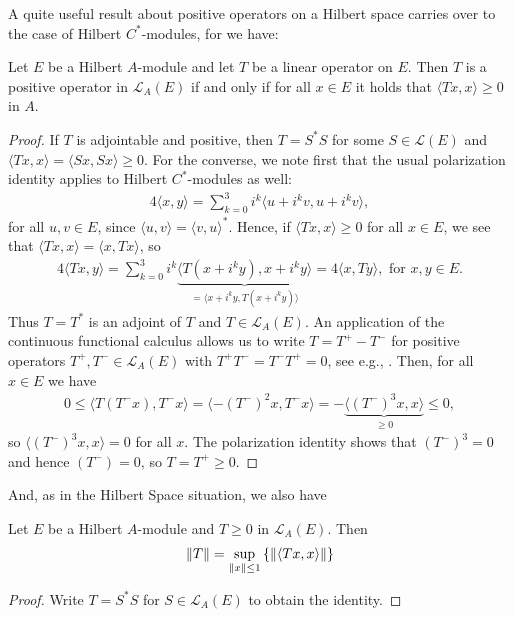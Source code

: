 A quite useful result about positive operators on a Hilbert space carries over to the case of Hilbert $C^*$-modules, for we have:
\begin{lemma}
	Let $E$ be a Hilbert $A$-module and let $T$ be a linear operator on $E$. Then $T$ is a positive operator in $\mathcal{L}_A(E)$ if and only if for all $x \in E$ it holds that $\langle Tx,x \rangle \geq 0$ in $A$.
	\label{mult:Tpos}
\end{lemma}
\begin{proof}
	If $T$ is adjointable and positive, then $T=S^*S$ for some $S \in \mathcal{L}(E)$ and $\langle Tx,x\rangle = \langle Sx,Sx\rangle\geq 0$. For the converse, we note first that the usual polarization identity applies to Hilbert $C^*$-modules as well:
	\begin{align*}
		4\langle x, y\rangle = \sum_{k=0}^3 i^{k} \langle u+i^kv,u+i^kv\rangle,
	\end{align*}
	for all $u,v \in E$, since $ \langle u,v \rangle = \langle v,u\rangle ^*$. Hence, if $\langle Tx , x \rangle \geq 0$ for all $x \in E$, we see that $\langle Tx,x\rangle = \langle x,Tx\rangle$, so
	\begin{align*}
		4 \langle Tx,y\rangle = \sum_{k=0}^3 i^k \underbrace{\langle T(x+i^ky),x+i^ky\rangle}_{=\langle x+i^ky,T(x+i^ky)\rangle} = 4 \langle x,Ty\rangle, \text{ for } x,y \in E.
	\end{align*}
	Thus $T=T^*$ is an adjoint of $T$ and $T \in \mathcal{L}_A(E)$. An application of the continuous functional calculus allows us to write $T=T^+-T^-$ for positive operators $T^+,T^- \in \mathcal{L}_A(E)$ with $T^+T^-=T^-T^+=0$, see e.g., \cite[Theorem 11.2]{zhu}. Then, for all $x \in E$ we have
	\begin{align*}
		0 \leq \langle T (T^-x),T^{-}x \rangle = \langle -(T^-)^2x,T^-x\rangle = -\underbrace{\langle (T^-)^3x,x\rangle}_{\geq 0 } \leq 0,
	\end{align*}
	so $\langle (T^-)^3 x,x \rangle = 0$ for all $x$. The polarization identity shows that $(T^-)^3=0$ and hence $(T^-)=0$, so $T=T^+\geq 0$.
\end{proof}
And, as in the Hilbert Space situation, we also have 
\begin{lemma}
	Let $E$ be a Hilbert $A$-module and $T \geq 0$ in $\mathcal{L}_A(E)$. Then
	\begin{align*}
		\left\lVert T \right\rVert = \sup_{\left\lVert x \right\rVert \leq 1}\left\{ \left\lVert \langle Tx,x\rangle \right\rVert \right\}
	\end{align*}
	\label{mult:normposT}
\end{lemma}
\begin{proof}
	Write $T=S^*S$ for $S \in \mathcal{L}_A(E)$ to obtain the identity.
\end{proof}


